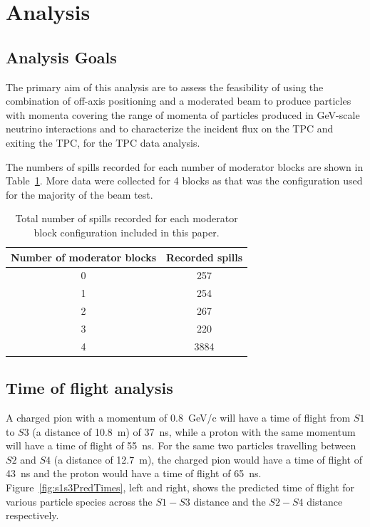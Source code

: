 \section{Analysis}
\label{hptpcPaper:sec:Analysis}
\subsection{Analysis Goals}

The primary aim of this analysis are to assess the feasibility of using the combination of off-axis positioning and a moderated beam to produce particles with momenta covering the range of momenta of particles produced in GeV-scale neutrino interactions and to characterize the incident flux on the TPC and exiting the TPC, for the TPC data analysis.

The numbers of spills recorded for each number of moderator blocks are shown in Table~\ref{tab:spills}.
More data were collected for 4 blocks as that was the configuration used for the majority of the beam test.

\begin{table}
  \centering
  \caption{Total number of spills recorded for each moderator block configuration included in this paper.}
  \begin{tabular}{c|c}
    \hline
    \hline
    Number of moderator blocks & Recorded spills \\
    \hline
    0 & 257 \\
    1 & 254 \\
    2 & 267 \\
    3 & 220 \\
    4 & 3884 \\
    \hline
  \end{tabular}
  \label{tab:spills}
\end{table}


\subsection{Time of flight analysis}
\label{timeofflightanalysissubsec}

A charged pion with a momentum of 0.8~GeV/c will have a time of flight from $\mathit{S1}$ to $\mathit{S3}$ (a distance of 10.8~m) of 37~ns, while a proton with the same momentum will have a time of flight of 55~ns.
For the same two particles travelling between $\mathit{S2}$ and $\mathit{S4}$ (a distance of 12.7~m), the charged pion would have a time of flight of 43~ns and the proton would have a time of flight of 65~ns.
Figure~\ref{fig:s1s3PredTimes}, left and right, shows the predicted time of flight for various particle species across the $\mathit{S1}-\mathit{S3}$ distance and the $\mathit{S2}-\mathit{S4}$ distance respectively.

